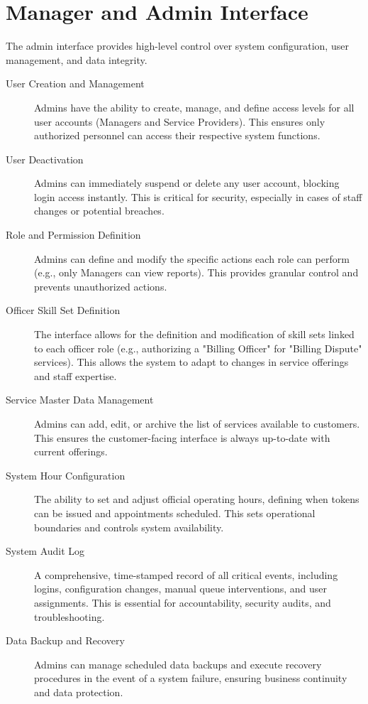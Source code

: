 \documentclass[12pt,a4paper]{report}
\begin{document}
\section{Manager and Admin Interface}

The admin interface provides high-level control over system configuration, user management, and data integrity.

\begin{description}
    \item[User Creation and Management] Admins have the ability to create, manage, and define access levels for all user accounts (Managers and Service Providers). This ensures only authorized personnel can access their respective system functions.
    \item[User Deactivation] Admins can immediately suspend or delete any user account, blocking login access instantly. This is critical for security, especially in cases of staff changes or potential breaches.
    \item[Role and Permission Definition] Admins can define and modify the specific actions each role can perform (e.g., only Managers can view reports). This provides granular control and prevents unauthorized actions.
    \item[Officer Skill Set Definition] The interface allows for the definition and modification of skill sets linked to each officer role (e.g., authorizing a "Billing Officer" for "Billing Dispute" services). This allows the system to adapt to changes in service offerings and staff expertise.
    \item[Service Master Data Management] Admins can add, edit, or archive the list of services available to customers. This ensures the customer-facing interface is always up-to-date with current offerings.
    \item[System Hour Configuration] The ability to set and adjust official operating hours, defining when tokens can be issued and appointments scheduled. This sets operational boundaries and controls system availability.
    \item[System Audit Log] A comprehensive, time-stamped record of all critical events, including logins, configuration changes, manual queue interventions, and user assignments. This is essential for accountability, security audits, and troubleshooting.
    \item[Data Backup and Recovery] Admins can manage scheduled data backups and execute recovery procedures in the event of a system failure, ensuring business continuity and data protection.
\end{description}
\end{document}
